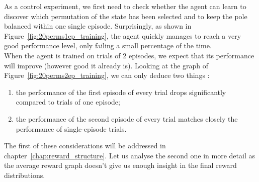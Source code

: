 \begin{table}
	\centering
	\caption{State permutations used for training and testing}
	\label{tab:20perms}
\end{table}

As a control experiment, we first need to check whether the agent can learn
to discover which permutation of the state has been selected and to keep the
pole balanced within one single episode. Surprisingly, as shown in 
Figure~\ref{fig:20perms1ep_training}, the agent quickly manages to reach
a very good performance level, only failing a small percentage of the time.\\

When the agent is trained on trials of 2 episodes, we expect that its
performance will improve (however good it already is). Looking at the graph 
of Figure~\ref{fig:20perms2ep_training}, we can only deduce two things : 
\begin{enumerate}
	\item the performance of the first episode of every trial drops 
		significantly compared to trials of one episode;
	\item the performance of the second episode of every trial matches
		closely the performance of single-episode trials.
\end{enumerate}
The first of these considerations will be addressed in
chapter~\ref{chap:reward_structure}. Let us analyse the second one in more detail
as the average reward graph doesn't give us enough insight in the final
reward distributions.\\

